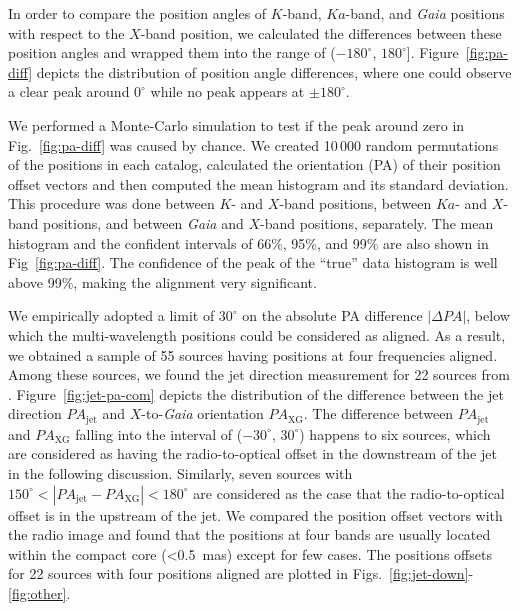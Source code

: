 \documentclass{aa}
\begin{document}
    In order to compare the position angles of $K$-band, $Ka$-band, and \textit{Gaia} positions with respect to the $X$-band position,
    we calculated the differences between these position angles and wrapped them into the range of ($-180^\circ$, $180^\circ$].
    Figure~\ref{fig:pa-diff} depicts the distribution of position angle differences, where one could observe a clear peak around $0^\circ$ while no peak appears at $\pm 180^\circ$.

    We performed a Monte-Carlo simulation to test if the peak around zero in Fig.~\ref{fig:pa-diff} was caused by chance.
    We created 10\,000 random permutations of the positions in each catalog, calculated the orientation (PA) of their position offset vectors and then computed the mean histogram and its standard deviation.
    This procedure was done between $K$- and $X$-band positions, between $Ka$- and $X$-band positions, and between \textit{Gaia} and $X$-band positions, separately.
    The mean histogram and the confident intervals of 66\%, 95\%, and 99\% are also shown in Fig~\ref{fig:pa-diff}.
    The confidence of the peak of the ``true'' data histogram is well above 99\%, making the alignment very significant.

    We empirically adopted a limit of $30^\circ$ on the absolute PA difference $|\Delta PA|$, below which the multi-wavelength positions could be considered as aligned.
    As a result, we obtained a sample of 55 sources having positions at four frequencies aligned.
    Among these sources, we found the jet direction measurement for 22 sources from \citet{2019ApJ...874...43L}.
    Figure~\ref{fig:jet-pa-com} depicts the distribution of the difference between the jet direction $PA_\mathrm{jet}$ and $X$-to-\textit{Gaia} orientation $PA_\mathrm{XG}$.
    The difference between $PA_\mathrm{jet}$ and $PA_\mathrm{XG}$ falling into the interval of ($-30^\circ$, $30^\circ$) happens to six sources,
    which are considered as having the radio-to-optical offset in the downstream of the jet in the following discussion.
    Similarly, seven sources with $150^\circ < |PA_\mathrm{jet} - PA_\mathrm{XG}| < 180^\circ$ are considered as the case that the radio-to-optical offset is in the upstream of the jet.
    We compared the position offset vectors with the radio image and found that the positions at four bands are usually located within the compact core (<0.5~mas) except for few cases.
    The positions offsets for 22 sources with four positions aligned are plotted in Figs.~\ref{fig:jet-down}-\ref{fig:other}.
\end{document}
